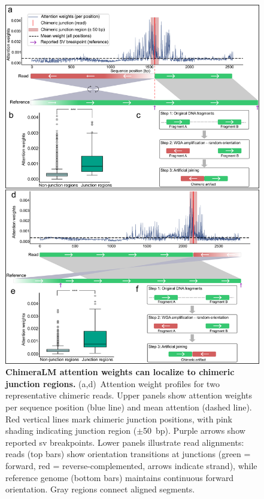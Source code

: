 \documentclass[pdflatex,sn-nature,lineno]{sn-jnl}%
\theoremstyle{thmstyleone}%
\theoremstyle{thmstyletwo}%
\theoremstyle{thmstylethree}%
\begin{document}
\begin{figure}[H]
	\begin{center}
		\includegraphics[width=\textwidth]{final_figures/figure4}
	\end{center}
	\caption{{\bf ChimeraLM attention weights can localize to chimeric junction regions.}
		(a,d)~Attention weight profiles for two representative chimeric reads. Upper panels show attention weights per sequence position (blue line) and mean attention (dashed line). Red vertical lines mark chimeric junction positions, with pink shading indicating junction region ($\pm$50~bp). Purple arrows show reported \gls{sv} breakpoints. Lower panels illustrate read alignments: reads (top bars) show orientation transitions at junctions (green = forward, red = reverse-complemented, arrows indicate strand), while reference genome (bottom bars) maintains continuous forward orientation. Gray regions connect aligned segments.
}
\end{figure}
\end{document}
